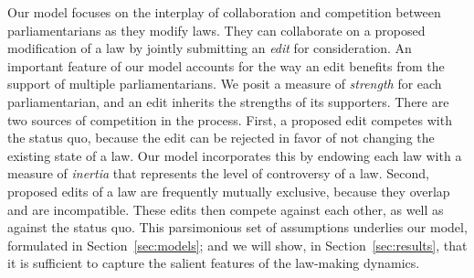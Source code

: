 Our model focuses on the interplay of collaboration and competition between parliamentarians as they modify laws.
They can collaborate on a proposed modification of a law by jointly submitting an {\em edit} for consideration.
An important feature of our model accounts for the way an edit benefits from the support of multiple parliamentarians.
We posit a measure of {\em strength} for each parliamentarian, and an edit inherits the strengths of its supporters.
There are two sources of competition in the process.
First, a proposed edit competes with the status quo, because the edit can be rejected in favor of not changing the existing state of a law.
Our model incorporates this by endowing each law with a measure of {\em inertia} that represents the level of controversy of a law.
Second, proposed edits of a law are frequently mutually exclusive, because they overlap and are incompatible.
These edits then compete against each other, as well as against the status quo.
This parsimonious set of assumptions underlies our model, formulated in Section~\ref{sec:models}; and we will show, in Section~\ref{sec:results}, that it is sufficient to capture the salient features of the law-making dynamics.
